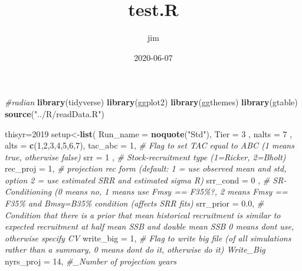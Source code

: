 \documentclass[]{article}
\title{test.R}
\author{jim}
\date{2020-06-07}
\newenvironment{Shaded}{\begin{snugshade}}{\end{snugshade}}
\newcommand{\CommentTok}[1]{\textcolor[rgb]{0.56,0.35,0.01}{\textit{#1}}}
\newcommand{\DataTypeTok}[1]{\textcolor[rgb]{0.13,0.29,0.53}{#1}}
\newcommand{\DecValTok}[1]{\textcolor[rgb]{0.00,0.00,0.81}{#1}}
\newcommand{\FloatTok}[1]{\textcolor[rgb]{0.00,0.00,0.81}{#1}}
\newcommand{\KeywordTok}[1]{\textcolor[rgb]{0.13,0.29,0.53}{\textbf{#1}}}
\newcommand{\NormalTok}[1]{#1}
\newcommand{\StringTok}[1]{\textcolor[rgb]{0.31,0.60,0.02}{#1}}
\begin{document}
\maketitle

\begin{Shaded}
\begin{Highlighting}[]
\CommentTok{\#radian}
\KeywordTok{library}\NormalTok{(tidyverse)}
\KeywordTok{library}\NormalTok{(ggplot2)}
\KeywordTok{library}\NormalTok{(ggthemes)}
\KeywordTok{library}\NormalTok{(gtable)}
\KeywordTok{source}\NormalTok{(}\StringTok{"../R/readData.R"}\NormalTok{)}
\end{Highlighting}
\end{Shaded}

\begin{Shaded}
\begin{Highlighting}[]
\NormalTok{thisyr=}\DecValTok{2019}
\NormalTok{setup\textless{}{-}}\KeywordTok{list}\NormalTok{(}
  \DataTypeTok{Run\_name     =} \KeywordTok{noquote}\NormalTok{(}\StringTok{"Std"}\NormalTok{),}
  \DataTypeTok{Tier         =} \DecValTok{3}\NormalTok{    ,}
  \DataTypeTok{nalts        =} \DecValTok{7}\NormalTok{    ,}
  \DataTypeTok{alts         =} \KeywordTok{c}\NormalTok{(}\DecValTok{1}\NormalTok{,}\DecValTok{2}\NormalTok{,}\DecValTok{3}\NormalTok{,}\DecValTok{4}\NormalTok{,}\DecValTok{5}\NormalTok{,}\DecValTok{6}\NormalTok{,}\DecValTok{7}\NormalTok{),}
  \DataTypeTok{tac\_abc      =} \DecValTok{1}\NormalTok{,    }\CommentTok{\# Flag to set TAC equal to ABC (1 means true, otherwise false)}
  \DataTypeTok{srr          =} \DecValTok{1}\NormalTok{ ,   }\CommentTok{\# Stock{-}recruitment type (1=Ricker, 2=Bholt)}
  \DataTypeTok{rec\_proj     =} \DecValTok{1}\NormalTok{,    }\CommentTok{\# projection rec form (default: 1 = use observed mean and std, option 2 = use estimated SRR and estimated sigma R)}
  \DataTypeTok{srr\_cond     =} \DecValTok{0}\NormalTok{ ,   }\CommentTok{\# SR{-}Conditioning (0 means no, 1 means use Fmsy == F35\%?, 2 means Fmsy == F35\% and Bmsy=B35\%  condition (affects SRR fits)}
  \DataTypeTok{srr\_prior    =} \FloatTok{0.0}\NormalTok{,  }\CommentTok{\# Condition that there is a prior that mean historical recruitment is similar to expected recruitment at half mean SSB and double mean SSB 0 means don\textquotesingle{}t use, otherwise specify CV}
  \DataTypeTok{write\_big    =} \DecValTok{1}\NormalTok{,    }\CommentTok{\# Flag to write big file (of all simulations rather than a summary, 0 means don\textquotesingle{}t do it, otherwise do it) Write\_Big}
  \DataTypeTok{nyrs\_proj    =} \DecValTok{14}\NormalTok{,   }\CommentTok{\#\_Number of projection years}

\end{Highlighting}
\end{Shaded}
\end{document}
